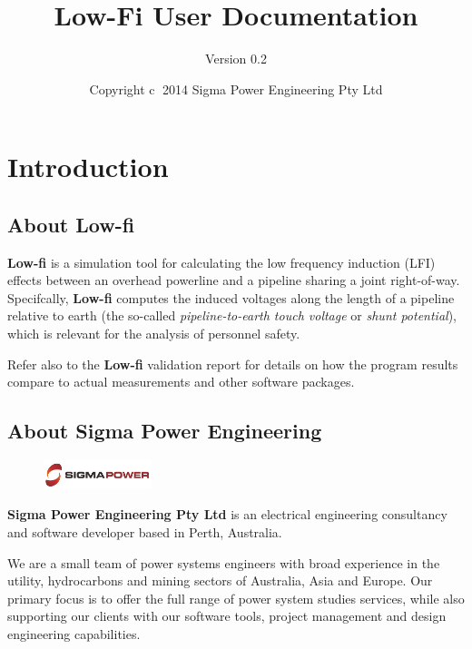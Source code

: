 \documentclass{article}
\title{Low-Fi User Documentation}
\author{Version 0.2}
\date{Copyright \textcircled{c}  2014 Sigma Power Engineering Pty Ltd}
\begin{document}
\pagestyle{plain}
\maketitle

\tableofcontents
\clearpage

\section{Introduction}
\subsection{About Low-fi}
\textbf{Low-fi} is a simulation tool for calculating the low frequency induction (LFI) effects between an overhead powerline and a pipeline sharing a joint right-of-way. Specifcally, \textbf{Low-fi} computes the induced voltages along the length of a pipeline relative to earth (the so-called \emph{pipeline-to-earth touch voltage} or \emph{shunt potential}), which is relevant for the analysis of personnel safety.

Refer also to the \textbf{Low-fi} validation report for details on how the program results compare to actual measurements and other software packages.

\subsection{About Sigma Power Engineering}
\begin{figure}[!ht]
    \includegraphics[width=0.28\textwidth]{./Figures/Sigma_Power.png}
\end{figure}


\textbf{Sigma Power Engineering Pty Ltd} is an electrical engineering consultancy and software developer based in Perth, Australia.

We are a small team of power systems engineers with broad experience in the utility, hydrocarbons and mining sectors of Australia, Asia and Europe. Our primary focus is to offer the full range of power system studies services, while also supporting our clients with our software tools, project management and design engineering capabilities.
\end{document}
